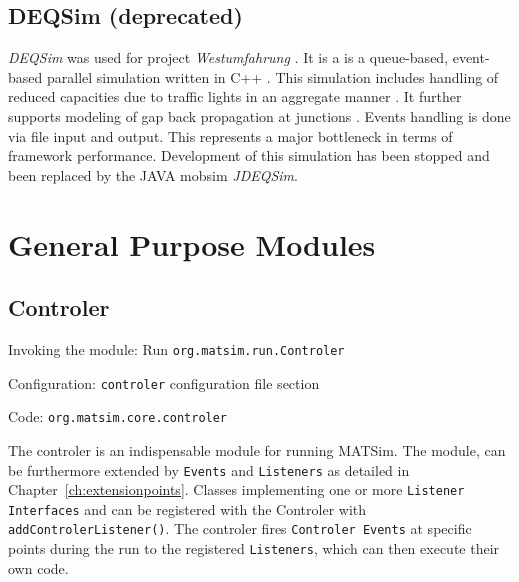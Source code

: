 \subsection{DEQSim (deprecated)}
\label{sec:deqsim}
\emph{DEQSim} was used for project \emph{Westumfahrung} \citep[][]{BalmerEtAl_ResRep_bdktzrh_2009}. It is a is a queue-based, event-based parallel simulation written in C++ \citep[][]{CharyparEtAl_TRR_2007, Charypar_PhDThesis_2008}. This simulation includes handling of reduced capacities due to traffic lights in an aggregate manner \citep[][p.139 ff]{Charypar_PhDThesis_2008}. It further supports modeling of gap back propagation at junctions \citep[][p.98 ff]{Charypar_PhDThesis_2008}. Events handling is done via file input and output. This represents a major bottleneck in terms of framework performance. Development of this simulation has been stopped and been replaced by the JAVA mobsim \emph{JDEQSim}.

\section{General Purpose Modules}
\label{sec:generalpurposemodules}

\subsection{Controler}
\label{sec:controler}
\begin{compactitem}
\item Invoking the module: Run \lstinline|org.matsim.run.Controler|
\item Configuration: \lstinline|controler| configuration file section
\item Code: \lstinline|org.matsim.core.controler|
\end{compactitem}

The controler is an indispensable module for running MATSim. The module, can be furthermore extended by \lstinline|Events| and \lstinline|Listeners| as detailed in Chapter~\ref{ch:extensionpoints}. Classes implementing one or more \lstinline|Listener Interfaces| and can be registered with the Controler with \lstinline|addControlerListener()|. The controler fires \lstinline|Controler Events| at specific points during the run to the registered \lstinline|Listeners|, which can then execute their own code.

